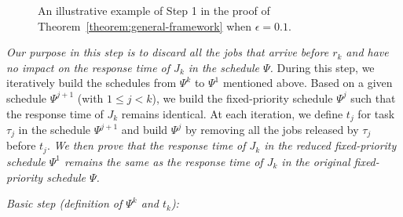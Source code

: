   


\begin{figure*}[t]
  \centering
\caption{An illustrative example of Step 1 in the proof of Theorem~\ref{theorem:general-framework} when $\epsilon = 0.1$.}
\label{fig:example}  
\end{figure*}



\emph{Our purpose in this step is to discard all the jobs that arrive before $r_k$ and have no impact on the response time of $J_k$ in the schedule
  $\Psi$. } During this step, we iteratively build the schedules from $\Psi^k$ to $\Psi^1$ mentioned above. Based on a given schedule $\Psi^{j+1}$ (with $1 \leq j < k$), we build the fixed-priority schedule $\Psi^j$ such that the response time of $J_k$ remains identical. At each iteration, we define $t_j$ for task $\tau_j$ in the schedule $\Psi^{j+1}$ and build $\Psi^j$ by removing all the jobs released by $\tau_j$ before $t_j$. \emph{We then prove that the response time of $J_k$ in the reduced fixed-priority schedule $\Psi^1$ remains the same as the response time of $J_k$ in  the original fixed-priority schedule $\Psi$.}


\noindent\textit{Basic step (definition of $\Psi^k$ and $t_k$):} 

